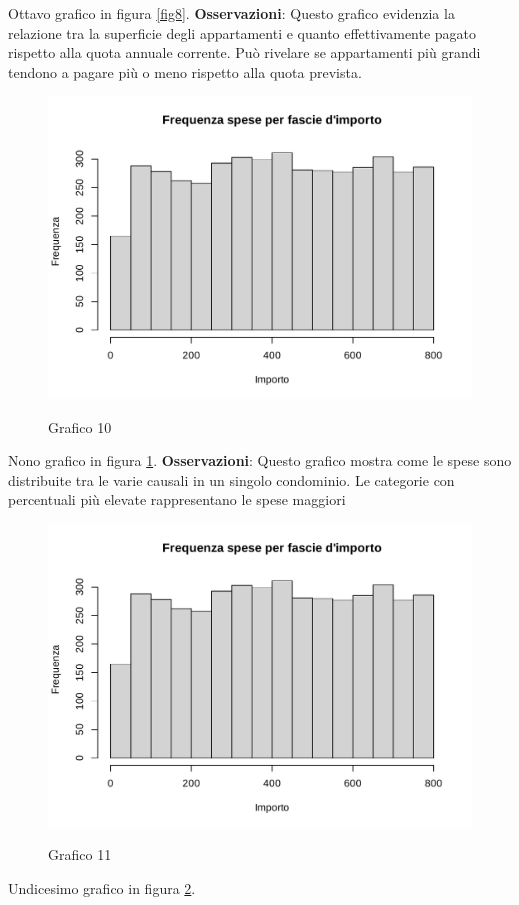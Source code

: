 Ottavo grafico in figura \ref{fig8}. \textbf{Osservazioni}: Questo grafico evidenzia la relazione tra la superficie degli appartamenti e quanto effettivamente pagato rispetto alla quota annuale corrente. Può rivelare se appartamenti più grandi tendono a pagare più o meno rispetto alla quota prevista.

\clearpage

\begin{figure}[t]
	\caption{Grafico 10}
	\includegraphics[page=10,width=\textwidth]{../R/grafici.pdf}
	\label{fig10}
\end{figure}

Nono grafico in figura \ref{fig10}. \textbf{Osservazioni}: Questo grafico mostra come le spese sono distribuite tra le varie causali in un singolo condominio. Le categorie con percentuali più elevate rappresentano le spese maggiori


\clearpage

\begin{figure}[t]
	\caption{Grafico 11}
	\includegraphics[page=11,width=\textwidth]{../R/grafici.pdf}
	\label{fig11}
\end{figure}

Undicesimo grafico in figura \ref{fig11}.

